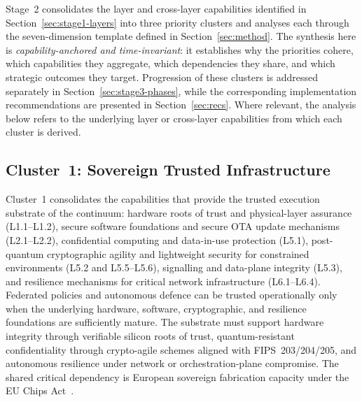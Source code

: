 \documentclass{ieeeaccess}
\begin{document}
Stage~2 consolidates the layer and cross-layer capabilities identified in Section~\ref{sec:stage1-layers} into three priority clusters and analyses each through the seven-dimension template defined in Section~\ref{sec:method}. The synthesis here is \emph{capability-anchored and time-invariant}: it establishes why the priorities cohere, which capabilities they aggregate, which dependencies they share, and which strategic outcomes they target. Progression of these clusters is addressed separately in Section~\ref{sec:stage3-phases}, while the corresponding implementation recommendations are presented in Section~\ref{sec:recs}. Where relevant, the analysis below refers to the underlying layer or cross-layer capabilities from which each cluster is derived.


\subsection{Cluster~1: Sovereign Trusted Infrastructure}
\label{subsec:c1}

Cluster~1 consolidates the capabilities that provide the trusted execution substrate of the continuum: hardware roots of trust and physical-layer assurance (L1.1--L1.2), secure software foundations and secure OTA update mechanisms (L2.1--L2.2), confidential computing and data-in-use protection (L5.1), post-quantum cryptographic agility and lightweight security for constrained environments (L5.2 and L5.5--L5.6), signalling and data-plane integrity (L5.3), and resilience mechanisms for critical network infrastructure (L6.1--L6.4). Federated policies and autonomous defence can be trusted operationally only when the underlying hardware, software, cryptographic, and resilience foundations are sufficiently mature. The substrate must support hardware integrity through verifiable silicon roots of trust, quantum-resistant confidentiality through crypto-agile schemes aligned with FIPS~203/204/205, and autonomous resilience under network or orchestration-plane compromise. The shared critical dependency is European sovereign fabrication capacity under the EU Chips Act~\cite{euchipsact,eurochipsaudit2025}.
\end{document}

